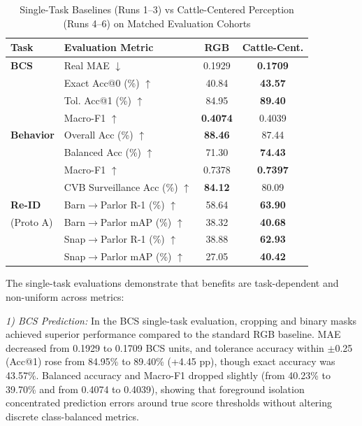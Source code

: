 \documentclass[conference]{IEEEtran}
\begin{document}
\begin{table}[htbp]
\caption{Single-Task Baselines (Runs 1--3) vs Cattle-Centered Perception (Runs 4--6) on Matched Evaluation Cohorts}
\label{tab:singletask_results}
\centering
\footnotesize
\setlength{\tabcolsep}{3.5pt}
\begin{tabularx}{\linewidth}{l X c c}
\toprule
\textbf{Task} & \textbf{Evaluation Metric} & \textbf{RGB} & \textbf{Cattle-Cent.} \\
\midrule
\textbf{BCS} & Real MAE $\downarrow$ & 0.1929 & \textbf{0.1709} \\
& Exact Acc@0 (\%) $\uparrow$ & 40.84 & \textbf{43.57} \\
& Tol. Acc@1 (\%) $\uparrow$ & 84.95 & \textbf{89.40} \\
& Macro-F1 $\uparrow$ & \textbf{0.4074} & 0.4039 \\
\midrule
\textbf{Behavior} & Overall Acc (\%) $\uparrow$ & \textbf{88.46} & 87.44 \\
& Balanced Acc (\%) $\uparrow$ & 71.30 & \textbf{74.43} \\
& Macro-F1 $\uparrow$ & 0.7378 & \textbf{0.7397} \\
& CVB Surveillance Acc (\%) $\uparrow$ & \textbf{84.12} & 80.09 \\
\midrule
\textbf{Re-ID} & Barn$\to$Parlor R-1 (\%) $\uparrow$ & 58.64 & \textbf{63.90} \\
(Proto A) & Barn$\to$Parlor mAP (\%) $\uparrow$ & 38.32 & \textbf{40.68} \\
& Snap$\to$Parlor R-1 (\%) $\uparrow$ & 38.88 & \textbf{62.93} \\
& Snap$\to$Parlor mAP (\%) $\uparrow$ & 27.05 & \textbf{40.42} \\
\bottomrule
\end{tabularx}
\end{table}

The single-task evaluations demonstrate that benefits are task-dependent and non-uniform across metrics:

\textit{1) BCS Prediction:} In the BCS single-task evaluation, cropping and binary masks achieved superior performance compared to the standard RGB baseline. MAE decreased from 0.1929 to 0.1709 BCS units, and tolerance accuracy within $\pm$0.25 (Acc@1) rose from 84.95\% to 89.40\% (+4.45 pp), though exact accuracy was 43.57\%. Balanced accuracy and Macro-F1 dropped slightly (from 40.23\% to 39.70\% and from 0.4074 to 0.4039), showing that foreground isolation concentrated prediction errors around true score thresholds without altering discrete class-balanced metrics.
\end{document}
